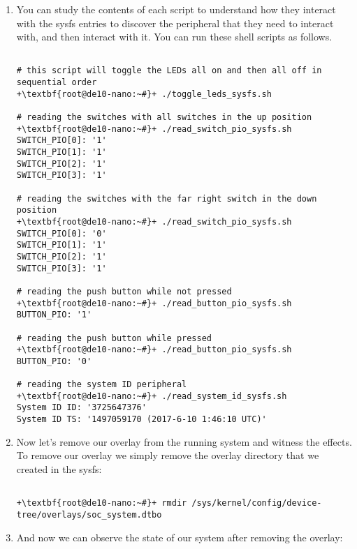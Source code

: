 \begin{flushleft}
\begin{enumerate}[
	label=\textbf{Step \arabic*.},
	leftmargin=*,
	widest={00},
	align=left]
\begin{verbatim}
\end{verbatim}

\item You can study the contents of each script to understand how they interact with the sysfs entries to discover the peripheral that they need to interact with, and then interact with it.  You can run these shell scripts as follows.

\begin{verbatim}

# this script will toggle the LEDs all on and then all off in sequential order
+\textbf{root@de10-nano:~#}+ ./toggle_leds_sysfs.sh

# reading the switches with all switches in the up position
+\textbf{root@de10-nano:~#}+ ./read_switch_pio_sysfs.sh
SWITCH_PIO[0]: '1'
SWITCH_PIO[1]: '1'
SWITCH_PIO[2]: '1'
SWITCH_PIO[3]: '1'

# reading the switches with the far right switch in the down position
+\textbf{root@de10-nano:~#}+ ./read_switch_pio_sysfs.sh
SWITCH_PIO[0]: '0'
SWITCH_PIO[1]: '1'
SWITCH_PIO[2]: '1'
SWITCH_PIO[3]: '1'

# reading the push button while not pressed
+\textbf{root@de10-nano:~#}+ ./read_button_pio_sysfs.sh
BUTTON_PIO: '1'

# reading the push button while pressed
+\textbf{root@de10-nano:~#}+ ./read_button_pio_sysfs.sh
BUTTON_PIO: '0'

# reading the system ID peripheral
+\textbf{root@de10-nano:~#}+ ./read_system_id_sysfs.sh
System ID ID: '3725647376'
System ID TS: '1497059170 (2017-6-10 1:46:10 UTC)'

\end{verbatim}

\item Now let's remove our overlay from the running system and witness the effects.  To remove our overlay we simply remove the overlay directory that we created in the sysfs:

\begin{verbatim}

+\textbf{root@de10-nano:~#}+ rmdir /sys/kernel/config/device-tree/overlays/soc_system.dtbo

\end{verbatim}

\item And now we can observe the state of our system after removing the overlay:


\end{enumerate}
\end{flushleft}

